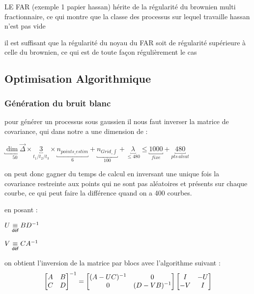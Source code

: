 

LE FAR (exemple 1 papier hassan) hérite de la régularité du brownien multi fractionnaire, ce qui montre que la classe des processus sur lequel travaille hassan n'est pas vide

il est suffisant que la régularité du noyau du FAR soit de régularité supérieure à celle du brownien, ce qui est de toute façon régulièrement le cas


\subsection{Optimisation Algorithmique}

\subsubsection{Génération du bruit blanc}

pour générer un processus sous gaussien il nous faut inverser la matrice de covariance, qui dans notre a une dimension de :

$\underbracket{\dim \vec\Delta}_{50} \times \underbracket{3}_{t_1 / t_2 / t_3} \times \underbracket{n_{points\_estim}}_{6} + \underbracket{n_{Grid\_\int}}_{100} + \underbracket{\lambda}_{\leq 480} \leq \underbracket{1000}_{fixe} + \underbracket{480}_{pts \, aleat}$

on peut donc gagner du temps de calcul en inversant une unique fois la covariance restreinte aux points qui ne sont pas aléatoires et présents sur chaque courbe, ce qui peut faire la différence quand on a 400 courbes.

en posant : 

$U \isdef B \inverse D$

$V \isdef C \inverse A$


on obtient l'inversion de la matrice par blocs avec l'algorithme suivant :
$$
\begin{bmatrix}
A & B \\
C & D
\end{bmatrix}^{-1}
=
\begin{bmatrix}
\inverse{(A - UC)} & 0 \\
0 & \inverse{(D - VB)}
\end{bmatrix}
\begin{bmatrix}
I & - U \\
- V & I
\end{bmatrix}
$$

